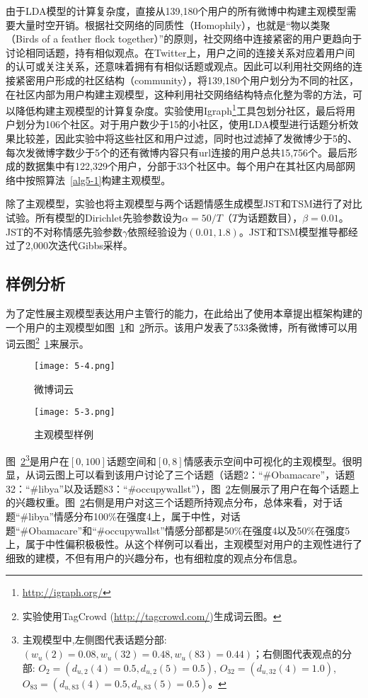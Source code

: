 由于LDA模型的计算复杂度，直接从139,180个用户的所有微博中构建主观模型需要大量时空开销。根据社交网络的同质性（Homophily），也就是“物以类聚（Birds of a feather flock together）”的原则，社交网络中连接紧密的用户更趋向于讨论相同话题，持有相似观点。在Twitter上，用户之间的连接关系对应着用户间的认可或关注关系，还意味着拥有有相似话题或观点。因此可以利用社交网络的连接紧密用户形成的社区结构（community），将139,180个用户划分为不同的社区，在社区内部为用户构建主观模型，这种利用社交网络结构特点化整为零的方法，可以降低构建主观模型的计算复杂度。实验使用Igraph\footnote{\url{http://igraph.org/}}工具包划分社区，最后将用户划分为106个社区。对于用户数少于15的小社区，使用LDA模型进行话题分析效果比较差，因此实验中将这些社区和用户过滤，同时也过滤掉了发微博少于5的、每次发微博字数少于5个的还有微博内容只有url连接的用户总共15,756个。最后形成的数据集中有122,329个用户，分部于33个社区中。每个用户在其社区内局部网络中按照算法~\ref{alg5-1}构建主观模型。

除了主观模型，实验也将主观模型与两个话题情感生成模型JST和TSM进行了对比试验。所有模型的Dirichlet先验参数设为$ \alpha=50/T $（$ T $为话题数目），$ \beta=0.01 $。JST的不对称情感先验参数$ \gamma $依照经验设为$ (0.01, 1.8) $。JST和TSM模型推导都经过了2,000次迭代Gibbs采样。

\subsection{样例分析}
为了定性展主观模型表达用户主管行的能力，在此给出了使用本章提出框架构建的一个用户的主观模型如图~\ref{fig5:a}和~\ref{fig5:b}所示。该用户发表了533条微博，所有微博可以用词云图\footnote{实验使用TagCrowd (\url{http://tagcrowd.com/})生成词云图。}~\ref{fig5:a}来展示。

\begin{figure}[htb]
\centering
\texttt{[image: 5-4.png]}
\caption{微博词云}
\label{fig5:a}
\end{figure}

\begin{figure}[htb]
\centering
\texttt{[image: 5-3.png]}
\caption{主观模型样例}
\label{fig5:b}
\end{figure}

图~\ref{fig5:b}\footnote{主观模型中,左侧图代表话题分部: $ (  w_{u}\left( 2 \right)=0.08,w_{u}\left( 32 \right)=0.48, w_{u}\left( 83 \right)=0.44)  $；右侧图代表观点的分部: $ O_{2}=( d_{u,2} \left( 4 \right)=0.5, d_{u,2} \left( 5 \right)=0.5)$, $O_{32}=(d_{u,32} \left( 4 \right)=1.0) $, $ O_{83}=( d_{u,83} \left( 4 \right)=0.5, d_{u,83} \left( 5 \right)=0.5 ) $。}是用户在$ [0,100] $话题空间和$ [0,8] $情感表示空间中可视化的主观模型。很明显，从词云图上可以看到该用户讨论了三个话题（话题2：``\#Obamacare''，话题32：``\#libya''以及话题83：``\#occupywallst''），图~\ref{fig5:b}左侧展示了用户在每个话题上的兴趣权重。图~\ref{fig5:b}右侧是用户对这三个话题所持观点分布，总体来看，对于话题``\#libya''情感分布100\%在强度4上，属于中性，对话题``\#Obamacare''和``\#occupywallst''情感分部都是50\%在强度4以及50\%在强度5上，属于中性偏积极极性。从这个样例可以看出，主观模型对用户的主观性进行了细致的建模，不但有用户的兴趣分布，也有细粒度的观点分布信息。

